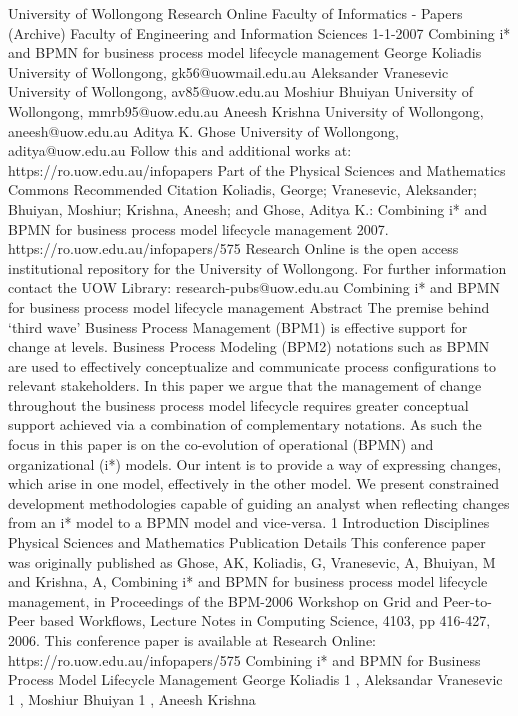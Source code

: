 University of Wollongong
Research Online
Faculty of Informatics - Papers (Archive) Faculty of Engineering and Information
Sciences
1-1-2007
Combining i* and BPMN for business process model lifecycle management
George Koliadis
University of Wollongong, gk56@uowmail.edu.au
Aleksander Vranesevic
University of Wollongong, av85@uow.edu.au
Moshiur Bhuiyan
University of Wollongong, mmrb95@uow.edu.au
Aneesh Krishna
University of Wollongong, aneesh@uow.edu.au
Aditya K. Ghose
University of Wollongong, aditya@uow.edu.au
Follow this and additional works at: https://ro.uow.edu.au/infopapers
Part of the Physical Sciences and Mathematics Commons
Recommended Citation
Koliadis, George; Vranesevic, Aleksander; Bhuiyan, Moshiur; Krishna, Aneesh; and Ghose, Aditya K.:
Combining i* and BPMN for business process model lifecycle management 2007.
https://ro.uow.edu.au/infopapers/575
Research Online is the open access institutional repository for the University of Wollongong. For further information
contact the UOW Library: research-pubs@uow.edu.au 
Combining i* and BPMN for business process model lifecycle management
Abstract
The premise behind ‘third wave’ Business Process Management (BPM1) is effective support for change at
levels. Business Process Modeling (BPM2) notations such as BPMN are used to effectively conceptualize
and communicate process configurations to relevant stakeholders. In this paper we argue that the
management of change throughout the business process model lifecycle requires greater conceptual
support achieved via a combination of complementary notations. As such the focus in this paper is on the
co-evolution of operational (BPMN) and organizational (i*) models. Our intent is to provide a way of
expressing changes, which arise in one model, effectively in the other model. We present constrained
development methodologies capable of guiding an analyst when reflecting changes from an i* model to a
BPMN model and vice-versa. 1 Introduction
Disciplines
Physical Sciences and Mathematics
Publication Details
This conference paper was originally published as Ghose, AK, Koliadis, G, Vranesevic, A, Bhuiyan, M and
Krishna, A, Combining i* and BPMN for business process model lifecycle management, in Proceedings of
the BPM-2006 Workshop on Grid and Peer-to-Peer based Workflows, Lecture Notes in Computing
Science, 4103, pp 416-427, 2006.
This conference paper is available at Research Online: https://ro.uow.edu.au/infopapers/575 
Combining i* and BPMN for
Business Process Model Lifecycle Management
George Koliadis
1
, Aleksandar Vranesevic
1
, Moshiur Bhuiyan
1
, Aneesh Krishna
